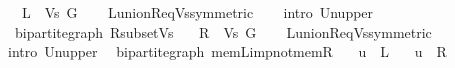 \begin{isabellebody}
\ \ \ {\isachardoublequoteopen}L\ {\isasymsubseteq}\ Vs\ G{\isachardoublequoteclose}%
\endisataginvisible
{\isafoldinvisible}%
%
\isadeliminvisible
\isanewline
%
\endisadeliminvisible
%
\isadelimproof
\ \ %
\endisadelimproof
%
\isatagproof
{}\isamarkupfalse%
\ L{\isacharunderscore}{\kern0pt}union{\isacharunderscore}{\kern0pt}R{\isacharunderscore}{\kern0pt}eq{\isacharunderscore}{\kern0pt}Vs{\isacharbrackleft}{\kern0pt}symmetric{\isacharbrackright}{\kern0pt}\isanewline
\ \ \isamarkupfalse%
\ {\isacharparenleft}{\kern0pt}intro\ Un{\isacharunderscore}{\kern0pt}upper{}{\isacharparenright}{\kern0pt}%
\endisatagproof
{\isafoldproof}%
%
\isadelimproof
\isanewline
%
\endisadelimproof
%
\isadeliminvisible
\isanewline
%
\endisadeliminvisible
%
\isataginvisible
{}\isamarkupfalse%
\ {\isacharparenleft}{\kern0pt}\ bipartite{\isacharunderscore}{\kern0pt}graph{\isacharparenright}{\kern0pt}\ R{\isacharunderscore}{\kern0pt}subset{\isacharunderscore}{\kern0pt}Vs{\isacharcolon}{\kern0pt}\isanewline
\ \ \ {\isachardoublequoteopen}R\ {\isasymsubseteq}\ Vs\ G{\isachardoublequoteclose}%
\endisataginvisible
{\isafoldinvisible}%
%
\isadeliminvisible
\isanewline
%
\endisadeliminvisible
%
\isadelimproof
\ \ %
\endisadelimproof
%
\isatagproof
{}\isamarkupfalse%
\ L{\isacharunderscore}{\kern0pt}union{\isacharunderscore}{\kern0pt}R{\isacharunderscore}{\kern0pt}eq{\isacharunderscore}{\kern0pt}Vs{\isacharbrackleft}{\kern0pt}symmetric{\isacharbrackright}{\kern0pt}\isanewline
\ \ \isamarkupfalse%
\ {\isacharparenleft}{\kern0pt}intro\ Un{\isacharunderscore}{\kern0pt}upper{}{\isacharparenright}{\kern0pt}%
\endisatagproof
{\isafoldproof}%
%
\isadelimproof
\isanewline
%
\endisadelimproof
%
\isadeliminvisible
\isanewline
%
\endisadeliminvisible
%
\isataginvisible
{}\isamarkupfalse%
\ {\isacharparenleft}{\kern0pt}\ bipartite{\isacharunderscore}{\kern0pt}graph{\isacharparenright}{\kern0pt}\ mem{\isacharunderscore}{\kern0pt}L{\isacharunderscore}{\kern0pt}imp{\isacharunderscore}{\kern0pt}not{\isacharunderscore}{\kern0pt}mem{\isacharunderscore}{\kern0pt}R{\isacharcolon}{\kern0pt}\isanewline
\ \ \ {\isachardoublequoteopen}u\ {\isasymin}\ L{\isachardoublequoteclose}\isanewline
\ \ \ {\isachardoublequoteopen}u\ {\isasymnotin}\ R{\isachardoublequoteclose}%
\endisataginvisible
{\isafoldinvisible}%
%
\isadeliminvisible
\isanewline
%
\endisadeliminvisible
%
\isadelimproof
\ \ %
\endisadelimproof

\end{isabellebody}
